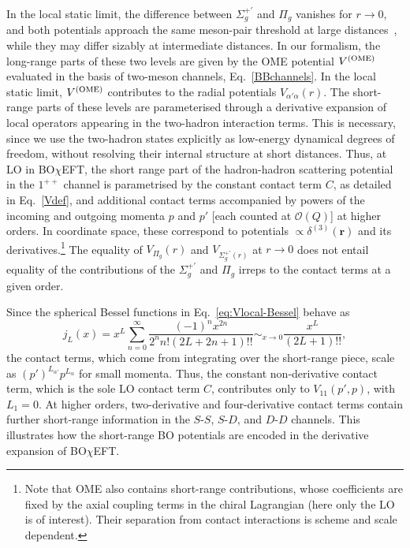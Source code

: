 \documentclass[aps,prd,showpacs,amsmath,twocolumn,superscriptaddress,floatfix,nofootinbib,notitlepage]{revtex4-2}
\newcommand{\ver}{{\bm r}}
\newcommand{\be}{\begin{equation}}
\newcommand{\ee}{\end{equation}}
\newcommand{\BOchiEFT}{BO$\chi$EFT\xspace}
\newcommand{\VOME}{V^{\rm (OME)}}
\begin{document}
In the local static limit, the difference between $\Sigma_g^{+\prime}$ and $\Pi_g$ vanishes for $r\to 0$, and both potentials approach the same meson-pair threshold at large distances~\cite{Berwein:2024ztx},
while they may differ sizably at intermediate distances. In our formalism, 
the long-range parts of these two levels are given by the OME potential $\VOME$ evaluated in the basis of two-meson channels, Eq.~\eqref{BBchannels}. In the local static limit, $\VOME$ contributes to the radial potentials $V_{\alpha'\alpha}(r)$. The short-range parts of these levels are parameterised through a derivative expansion of local operators appearing in the two-hadron interaction terms.
This is necessary, since we use the two-hadron states explicitly as low-energy dynamical degrees of freedom, without resolving their internal structure at short distances.
Thus, at LO in \BOchiEFT,
the short range part of the hadron-hadron scattering potential in the $1^{++}$ channel is parametrised by
the constant contact term $C$, as detailed in Eq.~\eqref{Vdef}, and
additional contact terms
accompanied by powers of the incoming and outgoing momenta $p$ and $p'$ [each counted at $\mathcal{O}(Q)$] at higher orders. In coordinate space, these correspond to potentials $\propto\delta^{(3)}(\ver)$ and its derivatives.\footnote{Note that OME also contains short-range contributions, whose coefficients are fixed by the axial coupling terms in the chiral Lagrangian (here only the LO is of interest). Their separation from contact interactions is scheme and scale dependent.}
The equality of $V_{\Pi_g}(r)$ and $V_{\Sigma_g^{+\prime}(r)}$ at $r\to 0$ does not entail equality of the contributions of the $\Sigma_g^{+\prime}$ and $\Pi_g$ irreps to the contact terms at a given order.

Since the spherical Bessel functions in Eq.~\eqref{eq:Vlocal-Bessel} behave as
\be
j_L(x)=x^L \sum_{n=0}^{\infty} \frac{(-1)^n x^{2 n}}{2^n n!(2 L+2 n+1)!!}\mathop{\sim}_{x\to 0} \frac{x^L}{(2L+1)!!},
\label{jLx}
\ee
the contact terms, which come from integrating over the short-range piece, scale as $(p')^{L_{\alpha'}}p^{L_\alpha}$ for small momenta. Thus, the constant non-derivative contact term, which is the sole LO contact term $C$, contributes only to $V_{11}(p',p)$, with $L_1=0$.
At higher orders, two-derivative and four-derivative contact terms contain further short-range information in the
$S$-$S$, $S$-$D$, and $D$-$D$ channels.
This illustrates how the short-range BO potentials are encoded in the derivative expansion of \BOchiEFT.
\end{document}
